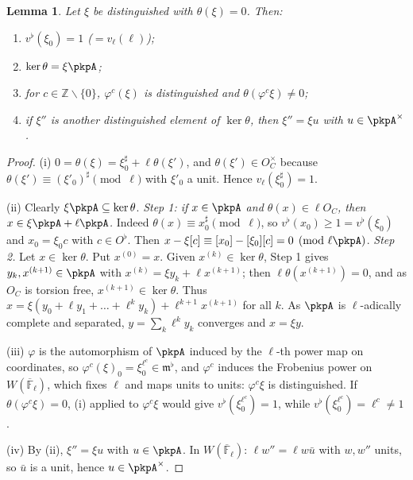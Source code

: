 \documentclass[10pt]{amsart}
\newtheorem{lemma}[theorem]{Lemma}
\theoremstyle{definition}
\theoremstyle{remark}
\newcommand{\Z}{\mathbb Z}
\begin{document}
\begin{lemma}\label{pkn:dist}
Let $\xi$ be distinguished with $\theta(\xi)=0$. Then:
\begin{enumerate}
\item[(i)] $v^\flat(\xi_0)=1$ ($=v_\ell(\ell)$);
\item[(ii)] $\ker\theta=\xi\pkpA$;
\item[(iii)] for $c\in\Z\smallsetminus\{0\}$, $\varphi^c(\xi)$ is distinguished and
$\theta(\varphi^c\xi)\ne0$;
\item[(iv)] if $\xi''$ is another distinguished element of $\ker\theta$, then $\xi''=\xi u$ with
$u\in\pkpA^\times$.
\end{enumerate}
\end{lemma}

\begin{proof}
(i) $0=\theta(\xi)=\xi_0^\sharp+\ell\theta(\xi')$, and $\theta(\xi')\in O_C^\times$ because
$\theta(\xi')\equiv(\xi'_0)^\sharp\pmod\ell$ with $\xi'_0$ a unit. Hence $v_\ell(\xi_0^\sharp)=1$.

(ii) Clearly $\xi\pkpA\subseteq\ker\theta$. \emph{Step 1: if $x\in\pkpA$ and $\theta(x)\in\ell O_C$,
then $x\in\xi\pkpA+\ell\pkpA$.} Indeed $\theta(x)\equiv x_0^\sharp\pmod\ell$, so $v^\flat(x_0)\ge1=
v^\flat(\xi_0)$ and $x_0=\xi_0c$ with $c\in O^\flat$. Then $x-\xi[c]\equiv[x_0]-[\xi_0][c]=0
\pmod{\ell\pkpA}$. \emph{Step 2.} Let $x\in\ker\theta$. Put $x^{(0)}=x$. Given $x^{(k)}\in\ker\theta$,
Step 1 gives $y_k,x^{(k+1)}\in\pkpA$ with $x^{(k)}=\xi y_k+\ell x^{(k+1)}$; then
$\ell\theta(x^{(k+1)})=0$, and as $O_C$ is torsion free, $x^{(k+1)}\in\ker\theta$. Thus
$x=\xi(y_0+\ell y_1+\dots+\ell^ky_k)+\ell^{k+1}x^{(k+1)}$ for all $k$. As $\pkpA$ is $\ell$-adically
complete and separated, $y=\sum_k\ell^ky_k$ converges and $x=\xi y$.

(iii) $\varphi$ is the automorphism of $\pkpA$ induced by the $\ell$-th power map on coordinates, so
$\varphi^c(\xi)_0=\xi_0^{\ell^c}\in\mathfrak m^\flat$, and $\varphi^c$ induces the Frobenius power on
$W(\overline{\mathbb F}_\ell)$, which fixes $\ell$ and maps units to units: $\varphi^c\xi$ is
distinguished. If $\theta(\varphi^c\xi)=0$, (i) applied to $\varphi^c\xi$ would give
$v^\flat(\xi_0^{\ell^c})=1$, while $v^\flat(\xi_0^{\ell^c})=\ell^c\ne1$.

(iv) By (ii), $\xi''=\xi u$ with $u\in\pkpA$. In $W(\overline{\mathbb F}_\ell)$: $\ell w''=\ell w\bar u$
with $w,w''$ units, so $\bar u$ is a unit, hence $u\in\pkpA^\times$.
\end{proof}
\end{document}
